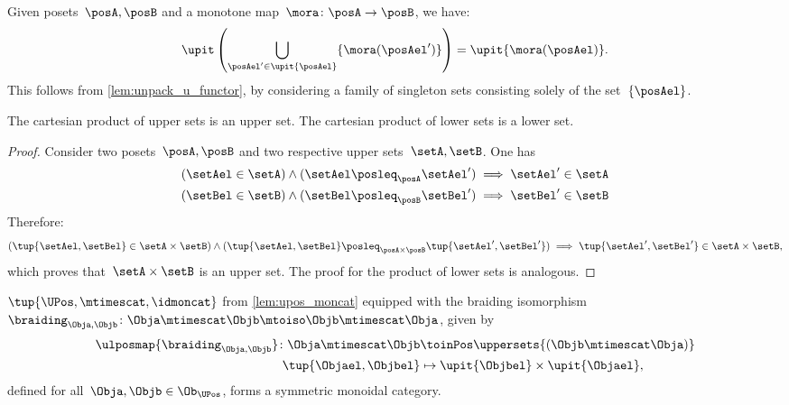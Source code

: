 \begin{remark}
  Given posets~$\posA,\posB$ and a monotone map~$\mora\colon \posA\to \posB$, we have:
  \begin{equation}
    \upit \left( \bigcup_{\posAel'\in \upit \{\posAel\}} \{\mora(\posAel')\}\right)=\upit \{\mora(\posAel)\}.
  \end{equation}
  This follows from \cref{lem:unpack_u_functor}, by considering a family of singleton sets consisting solely of the set~$\{\posAel\}$.
\end{remark}

\begin{lemma}
    The cartesian product of upper sets is an upper set.
    The cartesian product of lower sets is a lower set.
\end{lemma}
\begin{proof}
    Consider two posets~$\posA,\posB$ and two respective upper sets~$\setA,\setB$.
    One has
    \begin{equation*}
        \begin{aligned}
        (\setAel \in \setA)\wedge (\setAel \posleq_\posA \setAel') &\implies \setAel'\in \setA\\
        (\setBel \in \setB)\wedge (\setBel \posleq_\posB \setBel') &\implies \setBel'\in \setB
        \end{aligned}
    \end{equation*}
    Therefore:
    \begin{equation*}
        (\tup{\setAel,\setBel} \in \setA\times \setB)\wedge (\tup{\setAel,\setBel} \posleq_{\posA \times \posB} \tup{\setAel',\setBel'}) \implies \tup{\setAel',\setBel'}\in \setA \times \setB,
    \end{equation*}
    which proves that~$\setA\times \setB$ is an upper set.
    The proof for the product of lower sets is analogous.
\end{proof}
\begin{lemma}
    \label{lem:UPos-is-sym-mon}
    $\tup{\UPos,\mtimescat,\idmoncat}$ from \cref{lem:upos_moncat} equipped with the braiding isomorphism~$\braiding_{\Obja,\Objb}\colon \Obja \mtimescat \Objb \mtoiso \Objb \mtimescat \Obja$, given by
    \begin{equation}
        \label{eq:Upos-braiding}
        \begin{aligned}
        \ulposmap{\braiding_{\Obja,\Objb}}\colon \Obja \mtimescat \Objb &\toinPos \uppersets{(\Objb \mtimescat \Obja)}\\
            \tup{\Objael,\Objbel}&\mapsto \upit\{\Objbel\} \times \upit\{\Objael\},
        \end{aligned}
    \end{equation}
    defined for all~$\Obja,\Objb\in \Ob_{\UPos}$, forms a symmetric monoidal category.
\end{lemma}
